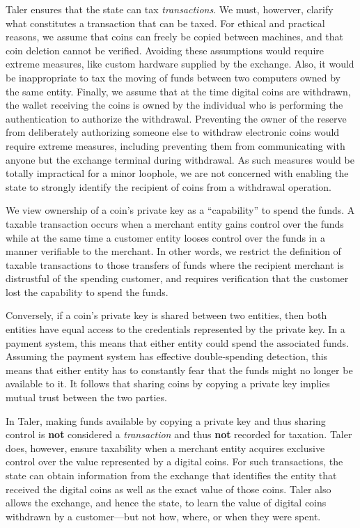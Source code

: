 \documentclass{llncs}
\begin{document}
Taler ensures that the state can tax {\em transactions}.  We must,
howerver, clarify what constitutes a transaction that can be taxed.
For ethical and practical reasons, we assume that coins can freely be
copied between machines, and that coin deletion cannot be verified.
Avoiding these assumptions would require extreme measures, like custom
hardware supplied by the exchange.  Also, it would be inappropriate to
tax the moving of funds between two computers owned by the same
entity.  Finally, we assume that at the time digital coins are
withdrawn, the wallet receiving the coins is owned by the individual
who is performing the authentication to authorize the withdrawal.
Preventing the owner of the reserve from deliberately authorizing
someone else to withdraw electronic coins would require extreme
measures, including preventing them from communicating with anyone but
the exchange terminal during withdrawal.  As such measures would be
totally impractical for a minor loophole, we are not concerned with
enabling the state to strongly identify the recipient of coins
from a withdrawal operation.

We view ownership of a coin's private key as a ``capability'' to spend
the funds.  A taxable transaction occurs when a merchant entity gains
control over the funds while at the same time a customer entity looses
control over the funds in a manner verifiable to the merchant.  In
other words, we restrict the definition of taxable transactions to
those transfers of funds where the recipient merchant is distrustful
of the spending customer, and requires verification that the customer
lost the capability to spend the funds.

Conversely, if a coin's private key is shared between two entities,
then both entities have equal access to the credentials represented by
the private key.  In a payment system, this means that either entity
could spend the associated funds.  Assuming the payment system has
effective double-spending detection, this means that either entity has
to constantly fear that the funds might no longer be available to it.
It follows that sharing coins by copying a private key implies mutual
trust between the two parties.

In Taler, making funds available by copying a private key and thus
sharing control is {\bf not} considered a {\em transaction} and thus
{\bf not} recorded for taxation.  Taler does, however, ensure
taxability when a merchant entity acquires exclusive control over the
value represented by a digital coins.  For such transactions, the state
can obtain information from the exchange that identifies
the entity that received the digital coins as well as the exact value
of those coins.  Taler also allows the exchange, and hence the state,
to learn the value of digital coins withdrawn by a customer---but not
how, where, or when they were spent.
\end{document}
